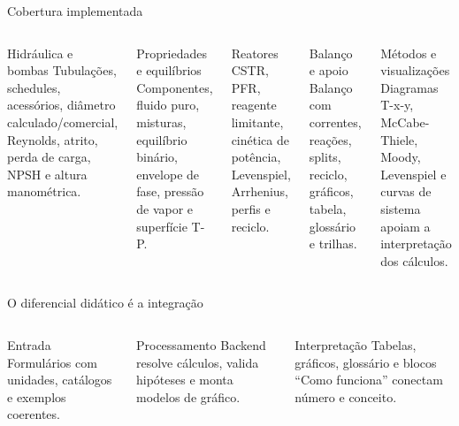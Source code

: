 \begin{frame}{Cobertura implementada}
  \footnotesize
  \begin{columns}[T,onlytextwidth]
      \begin{block}{Hidráulica e bombas}
        Tubulações, schedules, acessórios, diâmetro calculado/comercial, Reynolds, atrito, perda de carga, NPSH e altura manométrica.
      \end{block}
      \begin{block}{Propriedades e equilíbrios}
        Componentes, fluido puro, misturas, equilíbrio binário, envelope de fase, pressão de vapor e superfície T-P.
      \end{block}
      \begin{block}{Reatores}
        CSTR, PFR, reagente limitante, cinética de potência, Levenspiel, Arrhenius, perfis e reciclo.
      \end{block}
      \begin{block}{Balanço e apoio}
        Balanço com correntes, reações, splits, reciclo, gráficos, tabela, glossário e trilhas.
      \end{block}
      \begin{block}{Métodos e visualizações}
        Diagramas T-x-y, McCabe-Thiele, Moody, Levenspiel e curvas de sistema apoiam a interpretação dos cálculos.
      \end{block}
  \end{columns}
\end{frame}

\begin{frame}{O diferencial didático é a integração}
  \begin{columns}[T,onlytextwidth]
      \begin{block}{Entrada}
        Formulários com unidades, catálogos e exemplos coerentes.
      \end{block}
      \begin{block}{Processamento}
        Backend resolve cálculos, valida hipóteses e monta modelos de gráfico.
      \end{block}
      \begin{block}{Interpretação}
        Tabelas, gráficos, glossário e blocos ``Como funciona'' conectam número e conceito.
      \end{block}
  \end{columns}
\end{frame}

